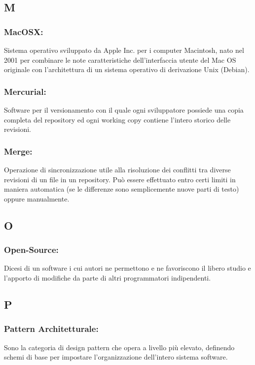 \subsection*{\huge{M}}
\subsubsection*{MacOSX:} Sistema operativo sviluppato da Apple Inc. per i
computer Macintosh, nato nel 2001 per combinare le note caratteristiche
dell'interfaccia utente del Mac OS originale con l'architettura di un sistema
operativo di derivazione Unix (Debian).

\subsubsection*{Mercurial:} Software per il versionamento con il quale ogni
sviluppatore possiede una copia completa del repository ed ogni working copy
contiene l'intero storico delle revisioni.

\subsubsection*{Merge:} Operazione di sincronizzazione utile alla
risoluzione dei conflitti tra diverse revisioni di un file in un repository.
Pu\`o essere effettuato entro certi limiti in maniera automatica (se le
differenze sono semplicemente nuove parti di testo) oppure manualmente.


\subsection*{\huge{O}}

\subsubsection*{Open-Source:} Dicesi di un software i cui autori ne permettono e
ne favoriscono il libero studio e l'apporto di modifiche da parte di altri programmatori indipendenti.

\subsection*{\huge{P}}

\subsubsection*{Pattern Architetturale:}
Sono la categoria di design pattern che opera a livello pi\`u elevato,
definendo schemi di base per impostare l'organizzazione dell'intero
sistema software.

